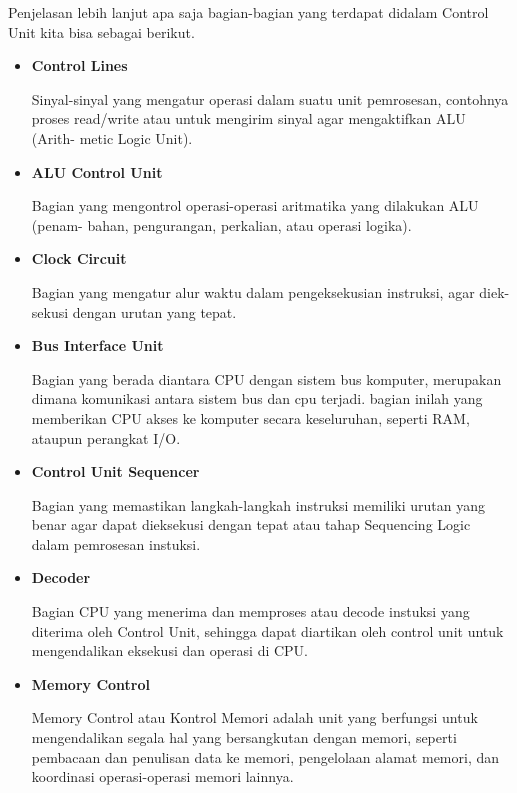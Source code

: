 \documentclass[12pt,a4paper]{article}
\begin{document}
      Penjelasan lebih lanjut apa saja bagian-bagian yang terdapat didalam
      Control Unit kita bisa sebagai berikut.

      \begin{itemize}

        \item \textbf{Control Lines}

          Sinyal-sinyal yang mengatur operasi dalam suatu unit pemrosesan, contohnya
          proses read/write atau untuk mengirim sinyal agar mengaktifkan ALU (Arith-
          metic Logic Unit).

        \item \textbf{ALU Control Unit}

          Bagian yang mengontrol operasi-operasi aritmatika yang dilakukan ALU (penam-
          bahan, pengurangan, perkalian, atau operasi logika).

        \item \textbf{Clock Circuit}

          Bagian yang mengatur alur waktu dalam pengeksekusian instruksi, agar diek-
          sekusi dengan urutan yang tepat.

        \item \textbf{Bus Interface Unit}

          Bagian yang berada diantara CPU dengan sistem bus komputer,
          merupakan dimana komunikasi antara sistem bus dan cpu terjadi.
          bagian inilah yang memberikan CPU akses ke komputer secara
          keseluruhan, seperti RAM, ataupun perangkat I/O.

        \item \textbf{Control Unit Sequencer}

          Bagian yang memastikan langkah-langkah instruksi memiliki urutan yang benar
          agar dapat dieksekusi dengan tepat atau tahap Sequencing Logic dalam
          pemrosesan instuksi.

        \item \textbf{Decoder}

          Bagian CPU yang menerima dan memproses atau decode instuksi yang diterima
          oleh Control Unit, sehingga dapat diartikan oleh control unit untuk
          mengendalikan eksekusi dan operasi di CPU.

        \item \textbf{Memory Control}

          Memory Control atau Kontrol Memori adalah unit yang berfungsi untuk
          mengendalikan segala hal yang bersangkutan dengan memori, seperti
          pembacaan dan penulisan data ke memori, pengelolaan alamat memori,
          dan koordinasi operasi-operasi memori lainnya.

      \end{itemize}
\end{document}
